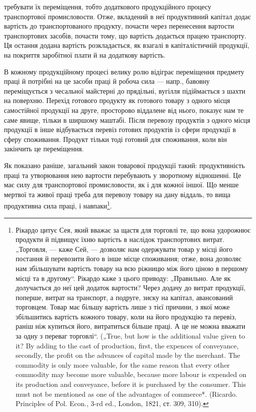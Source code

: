 требувати їх переміщення, тобто додаткового продукційного процесу
транспортової промисловости. Отже, вкладений в неї продуктивний капітал
додає вартість до транспортованого продукту, почасти через перенесення
вартости транспортових засобів, почасти тому, що вартість додається працею
транспорту. Ця остання додана вартість розкладається, як взагалі в
капіталістичній продукції, на покриття заробітної плати й на додаткову
вартість.

В кожному продукційному процесі велику ролю відіграє переміщення
предмету праці й потрібні на це засоби праці й робоча сила — напр.,
бавовну переміщується з чесальної майстерні до прядільні, вугілля підіймається
з шахти на поверхню. Перехід готового продукту як готового
товару з одного місця самостійної продукції на друге, просторово віддалене
від нього, показує нам те саме явище, тільки в ширшому маштабі.
Після перевозу продуктів з одного місця продукції в інше відбувається
перевіз готових продуктів із сфери продукції в сферу споживання.
Продукт тільки тоді готовий для споживання, коли він закінчить це
переміщення.

Як показано раніше, загальний закон товарової продукції такий: продуктивність
праці та утворювання нею вартости перебувають у зворотному
відношенні. Це має силу для транспортової промисловости, як і
для кожної іншої. Що менше мертвої та живої праці треба для перевозу
товару на дану віддаль, то вища продуктивна сила праці, і навпаки\footnote{
Рікардо цитує Сея, який вважає за щастя для торговлі те, що вона удорожнює
продукти й підвищує їхню вартість в наслідок транспортових витрат.
„Торговля, — каже Сей, — дозволяє нам одержувати товар у місці його постання й
перевозити його в інше місце споживання; отже, вона дозволяє нам збільшувати вартість товару на всю
ріжницю між його ціною в першому місці та в другому“.
Рікардо каже з цього приводу: „Правильно. Але як долучається до неї цей додаток
вартости? Через додачу до витрат продукції, поперше, витрат на транспорт,
а подруге, зиску на капітал, авансований торговцем. Товар має більшу вартість
лише з тієї причини, з якої може збільшитись вартість кожного товару, коли на
його продукцію та перевіз, раніш ніж купиться його, витратиться більше праці.
А це не можна вважати за одну з переваг торговлі“. („True, but how is the additional
value given to it? By adding to the cast of production, first, the expences of
conveyance, secondly, the profit on the advances of capital made by the merchant.
The commodity is only more valuable, for the same reason that every other commodity
may become more valuable, because more labour is expended on its production
and conveyance, before it is purchased by the consumer. This must not be
mentioned as one of the advantages of commerce*. (Ricardo. Principles of Pol. Econ.,
3-rd ed., London, 1821, ст. 309, 310).
}.

